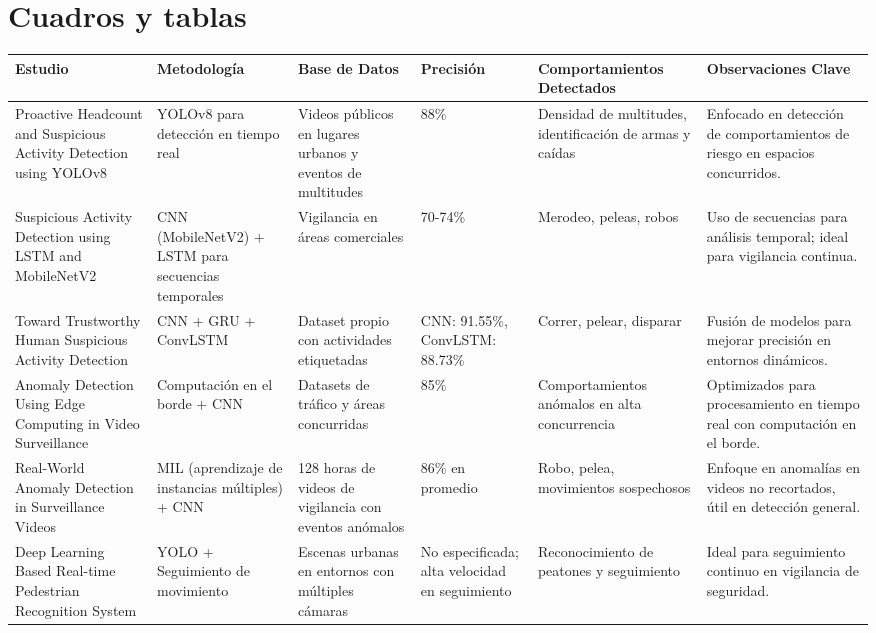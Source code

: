 \chapter{Cuadros y tablas}

\begin{landscape}
\begin{longtable}{|p{5cm}|p{4cm}|p{3cm}|p{2cm}|p{3cm}|p{5cm}|}
    \hline
    \textbf{Estudio} & \textbf{Metodología} & \textbf{Base de Datos} & \textbf{Precisión} & \textbf{Comportamientos Detectados} & \textbf{Observaciones Clave} \\ \hline
    Proactive Headcount and Suspicious Activity Detection using YOLOv8 & YOLOv8 para detección en tiempo real & Videos públicos en lugares urbanos y eventos de multitudes & 88\% & Densidad de multitudes, identificación de armas y caídas & Enfocado en detección de comportamientos de riesgo en espacios concurridos. \\ \hline
    Suspicious Activity Detection using LSTM and MobileNetV2 & CNN (MobileNetV2) + LSTM para secuencias temporales & Vigilancia en áreas comerciales & 70-74\% & Merodeo, peleas, robos & Uso de secuencias para análisis temporal; ideal para vigilancia continua. \\ \hline
    Toward Trustworthy Human Suspicious Activity Detection & CNN + GRU + ConvLSTM & Dataset propio con actividades etiquetadas & CNN: 91.55\%, ConvLSTM: 88.73\% & Correr, pelear, disparar & Fusión de modelos para mejorar precisión en entornos dinámicos. \\ \hline
    Anomaly Detection Using Edge Computing in Video Surveillance & Computación en el borde + CNN & Datasets de tráfico y áreas concurridas & 85\% & Comportamientos anómalos en alta concurrencia & Optimizados para procesamiento en tiempo real con computación en el borde. \\ \hline
    Real-World Anomaly Detection in Surveillance Videos & MIL (aprendizaje de instancias múltiples) + CNN & 128 horas de videos de vigilancia con eventos anómalos & 86\% en promedio & Robo, pelea, movimientos sospechosos & Enfoque en anomalías en videos no recortados, útil en detección general. \\ \hline
    Deep Learning Based Real-time Pedestrian Recognition System & YOLO + Seguimiento de movimiento & Escenas urbanas en entornos con múltiples cámaras & No especificada; alta velocidad en seguimiento & Reconocimiento de peatones y seguimiento & Ideal para seguimiento continuo en vigilancia de seguridad. \\ \hline

\end{longtable}
\end{landscape}
